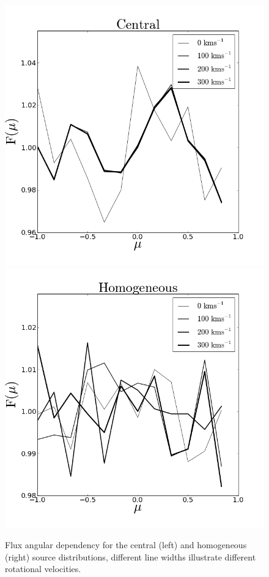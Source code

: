 \documentclass[usenatbib]{mn2e}
\begin{document}
\begin{figure}
\includegraphics[scale=0.3]{mu_central.png}
\includegraphics[scale=0.3]{mu_homogeneous.png}
\caption{Flux angular dependency for the central (left) and homogeneous
(right) source distributions, different line widths illustrate different
rotational velocities.
   \label{fig:flux}} 
\end{figure}
\end{document}
